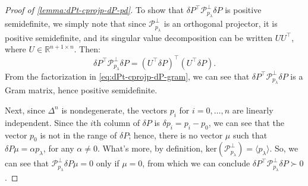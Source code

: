 \documentclass[eikonal.tex]{subfiles}
\begin{document}
\begin{proof}[Proof of \cref{lemma:dPt-cprojp-dP-pd}]
  To show that $\delta P^\top \mathcal{P}^\perp_{p_\lambda} \delta P$
  is positive semidefinite, we simply note that since
  $\mathcal{P}^\perp_{p_\lambda}$ is an orthogonal projector, it is
  positive semidefinite, and its singular value decomposition can be
  written $UU^\top$, where $U \in \mathbb{R}^{n+1 \times n}$. Then:
  \begin{equation}\label{eq:dPt-cprojp-dP-gram}
    \delta P^\top \mathcal{P}^\perp_{p_\lambda} \delta P = {(U^\top \delta P)}^\top {(U^\top \delta P)}.
  \end{equation}
  From the factorization in \cref{eq:dPt-cprojp-dP-gram}, we can see
  that $\delta P^\top \mathcal{P}^\perp_{p_\lambda} \delta P$ is a
  Gram matrix, hence positive semidefinite.

  Next, since $\Delta^n$ is nondegenerate, the vectors $p_i$ for
  $i = 0, \hdots, n$ are linearly independent. Since the $i$th column
  of $\delta P$ is $\delta p_i = p_i - p_0$, we can see that the
  vector $p_0$ is not in the range of $\delta P$; hence, there is no
  vector $\mu$ such that $\delta P \mu = \alpha p_\lambda$, for any
  $\alpha \neq 0$. What's more, by definition,
  $\text{ker}(\mathcal{P}_{p_\lambda}^\perp) = \langle p_\lambda
  \rangle$. So, we can see that
  $\mathcal{P}^\perp_{p_\lambda} \delta P \mu = 0$ only if $\mu = 0$,
  from which we can conclude
  $\delta P^\top \mathcal{P}^\perp_{p_\lambda} \delta P \succ 0$.
\end{proof}
\end{document}
